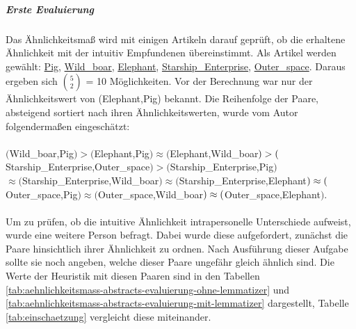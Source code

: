 \subparagraph{Erste Evaluierung}
Das Ähnlichkeitsmaß wird mit einigen Artikeln darauf geprüft, ob die erhaltene Ähnlichkeit mit der intuitiv Empfundenen übereinstimmt.
Als Artikel werden gewählt: \url{Pig}, \url{Wild_boar}, \url{Elephant}, \url{Starship_Enterprise}, \url{Outer_space}.
Daraus ergeben sich $5 \choose 2$ = 10 Möglichkeiten.
Vor der Berechnung war nur der Ähnlichkeitswert von (Elephant,Pig) bekannt. Die Reihenfolge der Paare, absteigend sortiert nach ihren Ähnlichkeitswerten, wurde vom Autor folgendermaßen eingeschätzt:
~\\~\\
$($Wild\_boar,Pig$) > ($Elephant,Pig$) \approx ($Elephant,Wild\_boar$)\\
 > ($Starship\_Enterprise,Outer\_space$) > ($Starship\_Enterprise,Pig$)$\\
$ \approx ($Starship\_Enterprise,Wild\_boar$) \approx ($Starship\_Enterprise,Elephant$)\\
\approx ($Outer\_space,Pig$) \approx ($Outer\_space,Wild\_boar$)\\
\approx ($Outer\_space,Elephant$)$.
~\\~\\
Um zu prüfen, ob die intuitive Ähnlichkeit intrapersonelle Unterschiede aufweist, wurde eine weitere Person befragt.
Dabei wurde diese aufgefordert, zunächst die Paare hinsichtlich ihrer Ähnlichkeit zu ordnen. Nach Ausführung dieser Aufgabe sollte sie noch angeben, welche dieser Paare ungefähr gleich ähnlich sind.
Die Werte der Heuristik mit diesen Paaren sind in den Tabellen \ref{tab:aehnlichkeitsmass-abstracts-evaluierung-ohne-lemmatizer} und \ref{tab:aehnlichkeitsmass-abstracts-evaluierung-mit-lemmatizer} dargestellt,
Tabelle \ref{tab:einschaetzung} vergleicht diese miteinander.

